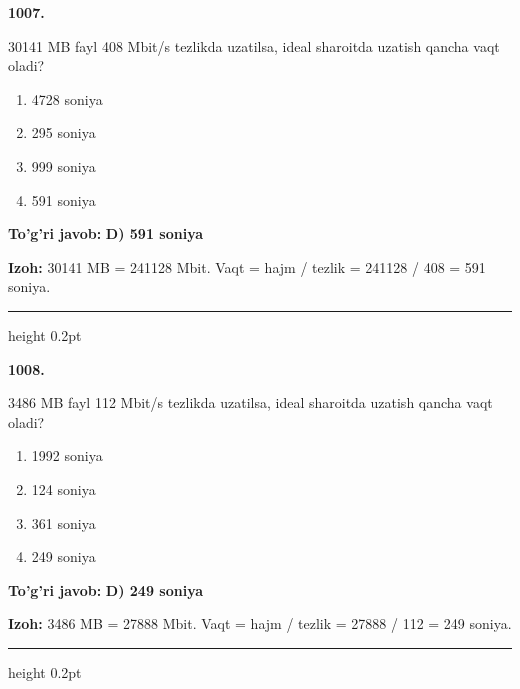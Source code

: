 \documentclass[10pt,a4paper,oneside]{article}
\begin{document}
\noindent\textbf{\color{ink}1007.}
\par
30141 MB fayl 408 Mbit/s tezlikda uzatilsa, ideal sharoitda uzatish qancha vaqt oladi?
\begin{enumerate}[label=\Alph*),leftmargin=9mm]
\item 4728 soniya
\item 295 soniya
\item 999 soniya
\item 591 soniya
\end{enumerate}
\begin{tcolorbox}[enhanced,breakable,colback=teal!4,colframe=teal!50!black,boxrule=0.5pt,arc=1.1mm,left=3mm,right=3mm,top=1.7mm,bottom=1.7mm,before skip=2mm,after skip=2mm]
\textbf{\color{teal}To'g'ri javob:} \textbf{D) 591 soniya}
\par\smallskip
\textbf{Izoh:} 30141 MB = 241128 Mbit. Vaqt = hajm / tezlik = 241128 / 408 = 591 soniya.
\end{tcolorbox}
\vspace{2mm}\hrule height 0.2pt \vspace{3mm}

\noindent\textbf{\color{ink}1008.}
\par
3486 MB fayl 112 Mbit/s tezlikda uzatilsa, ideal sharoitda uzatish qancha vaqt oladi?
\begin{enumerate}[label=\Alph*),leftmargin=9mm]
\item 1992 soniya
\item 124 soniya
\item 361 soniya
\item 249 soniya
\end{enumerate}
\begin{tcolorbox}[enhanced,breakable,colback=teal!4,colframe=teal!50!black,boxrule=0.5pt,arc=1.1mm,left=3mm,right=3mm,top=1.7mm,bottom=1.7mm,before skip=2mm,after skip=2mm]
\textbf{\color{teal}To'g'ri javob:} \textbf{D) 249 soniya}
\par\smallskip
\textbf{Izoh:} 3486 MB = 27888 Mbit. Vaqt = hajm / tezlik = 27888 / 112 = 249 soniya.
\end{tcolorbox}
\vspace{2mm}\hrule height 0.2pt \vspace{3mm}
\end{document}

